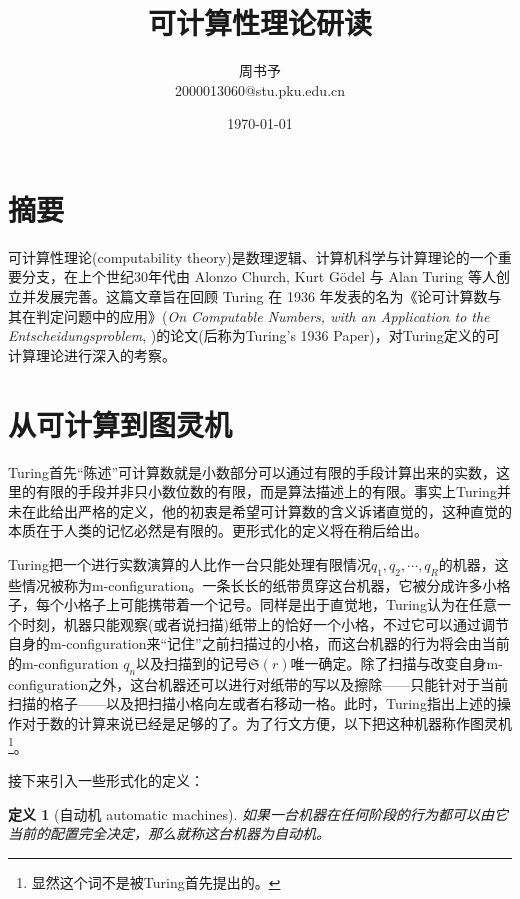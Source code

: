 \documentclass[8pt]{article}
\title{\heiti\zihao{1} 可计算性理论研读}
\author{\kaishu\zihao{-3} 周书予\\2000013060@stu.pku.edu.cn}
\date{\today}
\newtheorem{definition}{定义}
\begin{document}
\small
\pagestyle{fancy}
\chead{}


\maketitle


\section{摘要}

可计算性理论(computability theory)是数理逻辑、计算机科学与计算理论的一个重要分支，在上个世纪30年代由 Alonzo Church, Kurt G\"odel 与 Alan Turing 等人创立并发展完善。这篇文章旨在回顾 Turing 在 1936 年发表的名为《论可计算数与其在判定问题中的应用》(\emph{On Computable Numbers, with an Application to the Entscheidungsproblem}, \cite{Turing})的论文(后称为Turing's 1936 Paper)，对Turing定义的可计算理论进行深入的考察。

\section{从可计算到图灵机}

Turing首先“陈述”可计算数就是小数部分可以通过有限的手段计算出来的实数，这里的有限的手段并非只小数位数的有限，而是算法描述上的有限。事实上Turing并未在此给出严格的定义，他的初衷是希望可计算数的含义诉诸直觉的，这种直觉的本质在于人类的记忆必然是有限的。更形式化的定义将在稍后给出。

Turing把一个进行实数演算的人比作一台只能处理有限情况$q_1, q_2, \cdots, q_R$的机器，这些情况被称为m-configuration。一条长长的纸带贯穿这台机器，它被分成许多小格子，每个小格子上可能携带着一个记号。同样是出于直觉地，Turing认为在任意一个时刻，机器只能观察(或者说扫描)纸带上的恰好一个小格，不过它可以通过调节自身的m-configuration来“记住”之前扫描过的小格，而这台机器的行为将会由当前的m-configuration $q_n$以及扫描到的记号$\mathfrak{S}(r)$唯一确定。除了扫描与改变自身m-configuration之外，这台机器还可以进行对纸带的写以及擦除——只能针对于当前扫描的格子——以及把扫描小格向左或者右移动一格。此时，Turing指出上述的操作对于数的计算来说已经是足够的了。为了行文方便，以下把这种机器称作图灵机\footnote{显然这个词不是被Turing首先提出的。}。

接下来引入一些形式化的定义：
\begin{definition}[自动机 automatic machines]
	如果一台机器在任何阶段的行为都可以由它当前的配置完全决定，那么就称这台机器为自动机。
\end{definition}
\end{document}
